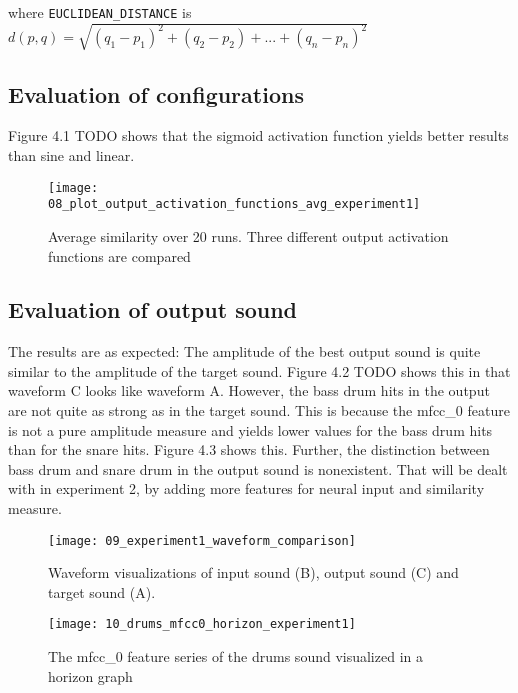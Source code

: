 where \texttt{EUCLIDEAN\_DISTANCE} is $d(p,q)=\sqrt{(q_1-p_1)^2+(q_2-p_2)+...+(q_n-p_n)^2}$

\subsection{Evaluation of configurations}
Figure 4.1 TODO shows that the sigmoid activation function yields better results than sine and linear.

\begin{figure}[h]
    \centering
    \texttt{[image: 08\_plot\_output\_activation\_functions\_avg\_experiment1]}
    \caption{Average similarity over 20 runs. Three different output activation functions are compared}
    \label{fig:plot_output_activation_functions_avg_experiment1}
\end{figure}

\subsection{Evaluation of output sound}
The results are as expected: The amplitude of the best output sound is quite similar to the amplitude of the target sound. Figure 4.2 TODO shows this in that waveform C looks like waveform A. However, the bass drum hits in the output are not quite as strong as in the target sound. This is because the mfcc\_0 feature is not a pure amplitude measure and yields lower values for the bass drum hits than for the snare hits. Figure 4.3 shows this. Further, the distinction between bass drum and snare drum in the output sound is nonexistent. That will be dealt with in experiment 2, by adding more features for neural input and similarity measure.

\begin{figure}[h]
    \centering
    \texttt{[image: 09\_experiment1\_waveform\_comparison]}
    \caption{Waveform visualizations of input sound (B), output sound (C) and target sound (A).}
    \label{fig:experiment1_waveform_comparison}
\end{figure}

\begin{figure}[h]
    \centering
    \texttt{[image: 10\_drums\_mfcc0\_horizon\_experiment1]}
    \caption{The mfcc\_0 feature series of the drums sound visualized in a horizon graph}
    \label{fig:drums_mfcc0_horizon_experiment1}
\end{figure}